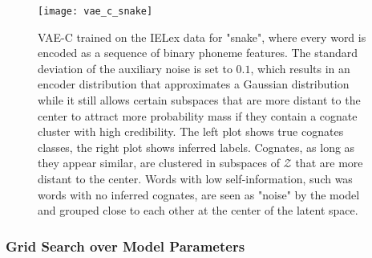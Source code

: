 \documentclass[6pt]{article}
\begin{document}
%
\begin{figure}[h!] %
   \centering
   \texttt{[image: vae\_c\_snake]} 
   \caption{VAE-C trained on the IELex data for "snake", where every word is encoded as a sequence of binary phoneme features. The standard deviation of the auxiliary noise is set to $0.1$, which results in an encoder distribution that approximates a Gaussian distribution while it still allows certain subspaces that are more distant to the center to attract more probability mass if they contain a cognate cluster with high credibility. The left plot shows true cognates classes, the right plot shows inferred labels. Cognates, as long as they appear similar, are clustered in subspaces of $\mathcal{Z}$ that are more distant to the center. Words with low self-information, such was words with no inferred cognates, are seen as "noise" by the model and grouped close to each other at the center of the latent space.}
   \label{fig:vae_c_snake}
\end{figure}
\subsubsection{Grid Search over Model Parameters}
\end{document}

